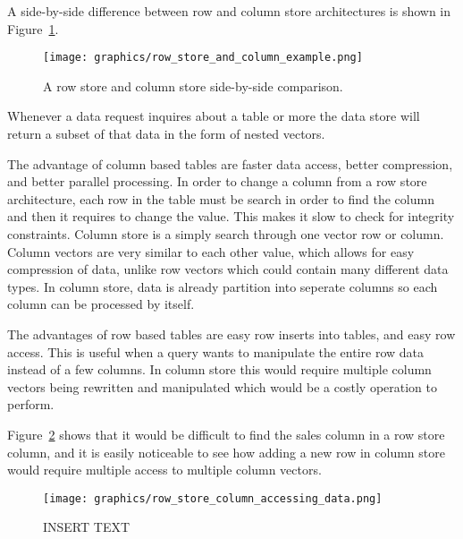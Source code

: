 \documentclass[letterpaper, 12pt]{article}
\begin{document}
A side-by-side difference between row and column store architectures is shown in Figure~\ref{fig:row_column_diff}.

\par\vspace{\baselineskip}
\begin{figure}
  \centering
  \texttt{[image: graphics/row\_store\_and\_column\_example.png]}
  \label{fig:row_column_diff}
  \caption{A row store and column store side-by-side comparison.}
\end{figure}

Whenever a data request inquires about a table or more the data store will return a subset of that
data in the form of nested vectors.
\par\vspace{\baselineskip}

The advantage of column based tables are faster data access, better compression, and better parallel processing.
In order to change a column from a row store architecture, each row in the table must be search in order to find the
column and then it requires to change the value. This makes it slow to check for integrity constraints. Column store
is a simply search through one vector row or column. Column vectors are very similar to each other value, which allows
for easy compression of data, unlike row vectors which could contain many different data types. In column store, data
is already partition into seperate columns so each column can be processed by itself.
\par\vspace{\baselineskip}

The advantages of row based tables are easy row inserts into tables, and easy row access. This is useful when a query
wants to manipulate the entire row data instead of a few columns. In column store this would require multiple column vectors
being rewritten and manipulated which would be a costly operation to perform.
\par\vspace{\baselineskip}

Figure~\ref{fig:row_col_access_data} shows that it would be 
difficult to find the sales column in a row store column, and it is easily
noticeable to see how adding a new row in column store would require multiple
access to multiple column vectors.
\par\vspace{\baselineskip}

\begin{figure}
  \centering
  \texttt{[image: graphics/row\_store\_column\_accessing\_data.png]}
  \caption{INSERT TEXT}
  \label{fig:row_col_access_data}
\end{figure}
\end{document}
